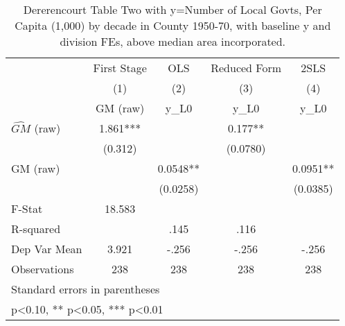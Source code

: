 \begin{table}[htbp]\centering
\def\sym#1{\ifmmode^{#1}\else\(^{#1}\)\fi}
\caption{Dererencourt Table Two with y=Number of Local Govts, Per Capita (1,000) by decade in County 1950-70, with baseline y and division FEs, above median area incorporated.}
\begin{tabular}{l*{4}{c}}
\toprule
                    & First Stage   &         OLS   &Reduced Form   &        2SLS   \\
                    &\multicolumn{1}{c}{(1)}&\multicolumn{1}{c}{(2)}&\multicolumn{1}{c}{(3)}&\multicolumn{1}{c}{(4)}\\
                    &\multicolumn{1}{c}{GM  (raw)}&\multicolumn{1}{c}{y\_L0}&\multicolumn{1}{c}{y\_L0}&\multicolumn{1}{c}{y\_L0}\\
\midrule
$\hat{GM}$ (raw)    &       1.861***&               &       0.177** &               \\
                    &     (0.312)   &               &    (0.0780)   &               \\
\addlinespace
GM  (raw)           &               &      0.0548** &               &      0.0951** \\
                    &               &    (0.0258)   &               &    (0.0385)   \\
\midrule
F-Stat              &      18.583   &               &               &               \\
R-squared           &               &        .145   &        .116   &               \\
Dep Var Mean        &       3.921   &       -.256   &       -.256   &       -.256   \\
Observations        &         238   &         238   &         238   &         238   \\
\bottomrule
\multicolumn{5}{l}{\footnotesize Standard errors in parentheses}\\
\multicolumn{5}{l}{\footnotesize * p<0.10, ** p<0.05, *** p<0.01}\\
\end{tabular}
\end{table}

